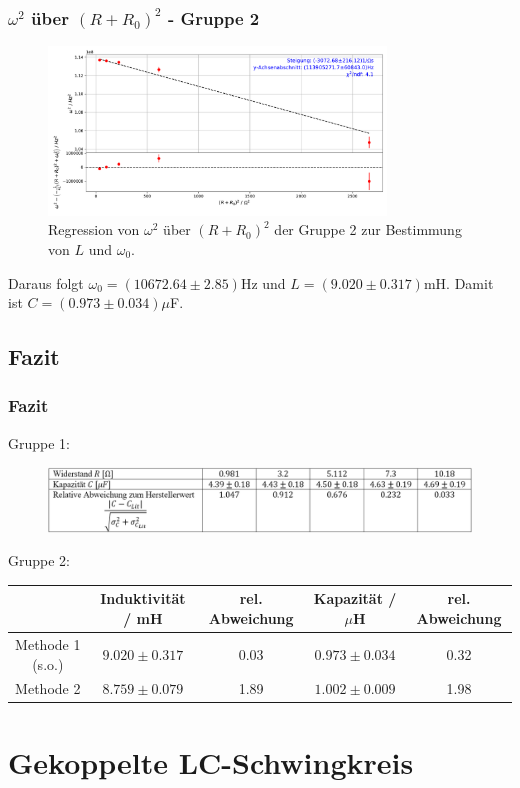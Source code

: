\documentclass{beamer}
\begin{document}
\begin{frame}
\frametitle{$\omega^2$ über $(R+R_0)^2$ - Gruppe 2}
\begin{figure}
\centering
\includegraphics[width=0.8\textwidth]{abbildungen/reg_Rome.pdf}
\caption{Regression von $\omega^2$ über $(R+R_0)^2$ der Gruppe 2 zur Bestimmung von $L$ und $\omega_0$.}
\end{figure}
Daraus folgt $\omega_0 = (10672.64\pm2.85)$Hz und $L=(9.020 \pm 0.317)$mH. Damit ist $C = (0.973 \pm 0.034)\mu$F.
\end{frame}




\subsection{Fazit}

\begin{frame}
\frametitle{Fazit}
Gruppe 1:
\begin{figure}
\includegraphics[width=\textwidth]{abbildungen/1VCWerte.PNG}
\end{figure}
Gruppe 2:
\begin{table}
\begin{adjustbox}{width = \textwidth}
\begin{tabular}{c|c|c|c|c}
& Induktivität / mH & rel. Abweichung & Kapazität / $\mu$H & rel. Abweichung \\
\hline
Methode 1 (s.o.) & $9.020 \pm 0.317$ & 0.03 & $0.973 \pm 0.034$ & 0.32 \\
Methode 2 & $8.759\pm0.079$ & 1.89 & $1.002 \pm 0.009$ & 1.98 
\end{tabular}
\end{adjustbox}
\end{table}

\end{frame}

\section{Gekoppelte LC-Schwingkreis}
\end{document}
